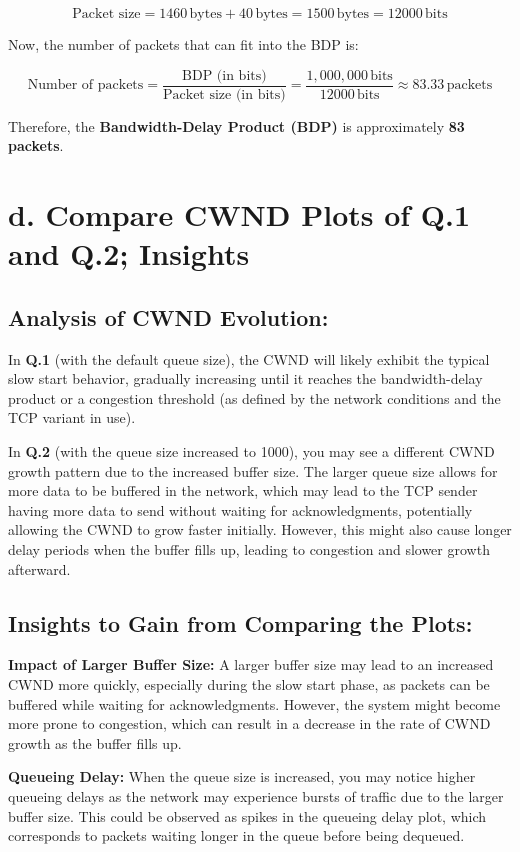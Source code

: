 \documentclass{article}
\begin{document}
\[
\text{Packet size} = 1460 \, \text{bytes} + 40 \, \text{bytes} = 1500 \, \text{bytes} = 12000 \, \text{bits}
\]

Now, the number of packets that can fit into the BDP is:

\[
\text{Number of packets} = \frac{\text{BDP (in bits)}}{\text{Packet size (in bits)}} = \frac{1,000,000 \, \text{bits}}{12000 \, \text{bits}} \approx 83.33 \, \text{packets}
\]

Therefore, the \textbf{Bandwidth-Delay Product (BDP)} is approximately \textbf{83 packets}.

\section*{d. Compare CWND Plots of Q.1 and Q.2; Insights}

\subsection*{Analysis of CWND Evolution:}

In \textbf{Q.1} (with the default queue size), the CWND will likely exhibit the typical slow start behavior, gradually increasing until it reaches the bandwidth-delay product or a congestion threshold (as defined by the network conditions and the TCP variant in use).

In \textbf{Q.2} (with the queue size increased to 1000), you may see a different CWND growth pattern due to the increased buffer size. The larger queue size allows for more data to be buffered in the network, which may lead to the TCP sender having more data to send without waiting for acknowledgments, potentially allowing the CWND to grow faster initially. However, this might also cause longer delay periods when the buffer fills up, leading to congestion and slower growth afterward.

\subsection*{Insights to Gain from Comparing the Plots:}

\textbf{Impact of Larger Buffer Size:} A larger buffer size may lead to an increased CWND more quickly, especially during the slow start phase, as packets can be buffered while waiting for acknowledgments. However, the system might become more prone to congestion, which can result in a decrease in the rate of CWND growth as the buffer fills up.

\textbf{Queueing Delay:} When the queue size is increased, you may notice higher queueing delays as the network may experience bursts of traffic due to the larger buffer size. This could be observed as spikes in the queueing delay plot, which corresponds to packets waiting longer in the queue before being dequeued.
\end{document}
